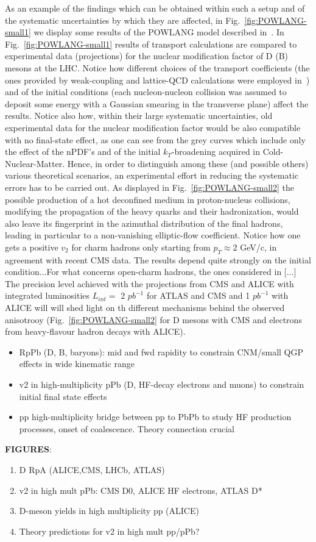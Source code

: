 As an example of the findings which can be obtained within such a setup and of the systematic uncertainties by which they are affected, in Fig.~\ref{fig:POWLANG-small1} we display some results of the POWLANG model described in~\cite{Beraudo:2015wsd}.
In Fig.~\ref{fig:POWLANG-small1} results of transport calculations are compared to experimental data (projections) for the nuclear modification factor of D (B) mesons at the LHC. Notice how different choices of the transport coefficients (the ones provided by weak-coupling and lattice-QCD calculations were employed in~\cite{Beraudo:2015wsd}) and of the initial conditions (each nucleon-nucleon collision was assumed to deposit some energy with a Gaussian smearing in the transverse plane) affect the results. Notice also how, within their large systematic uncertainties, old experimental data for the nuclear modification factor would be also compatible with no final-state effect, as one can see from the grey curves which include only the effect of the nPDF's and of the initial $k_T$-broadening acquired in Cold-Nuclear-Matter. Hence, in order to distinguish among these (and possible others) various theoretical scenarios, an experimental effort in reducing the systematic errors has to be carried out.
As displayed in Fig.~\ref{fig:POWLANG-small2} the possible production of a hot deconfined medium in proton-nucleus collisions, modifying the propagation of the heavy quarks and their hadronization, would also leave its fingerprint in the azimuthal distribution of the final hadrons, leading in particular to a non-vanishing elliptic-flow coefficient. Notice how one gets a positive $v_2$ for charm hadrons only starting from $p_T\!\approx\!2$ GeV/c, in agreement with recent CMS data. The results depend quite strongly on the initial condition...For what concerns open-charm hadrons, the ones considered in [...]
The precision level achieved with the projections from CMS and ALICE with integrated luminosities $L_{int}=$ 2 $pb^{-1}$ for ATLAS and CMS and 1 $pb^{-1}$ with ALICE will will shed light on th different mechanisms behind the observed anisotrooy (Fig.~\ref{fig:POWLANG-small2} for D mesons with CMS and electrons from heavy-flavour hadron decays with ALICE).


\begin{itemize}
\item{RpPb} (D, B, baryons): mid and fwd rapidity to constrain CNM/small QGP effects in wide kinematic range
\item{v2}  in high-multiplicity pPb (D, HF-decay electrons and muons) to constrain initial final state effects
\item{pp high-multiplicity} bridge between pp to PbPb to study HF production processes, onset of coalescence.
Theory connection crucial
\end{itemize}

\textbf{FIGURES}:
\begin{enumerate}
\item D RpA (ALICE,CMS, LHCb, ATLAS)
\item v2 in high mult pPb: CMS D0,  ALICE HF electrons, ATLAS D*
\item D-meson yields in high multiplicity pp (ALICE)
\item Theory predictions for v2 in high mult pp/pPb?
\end{enumerate}

